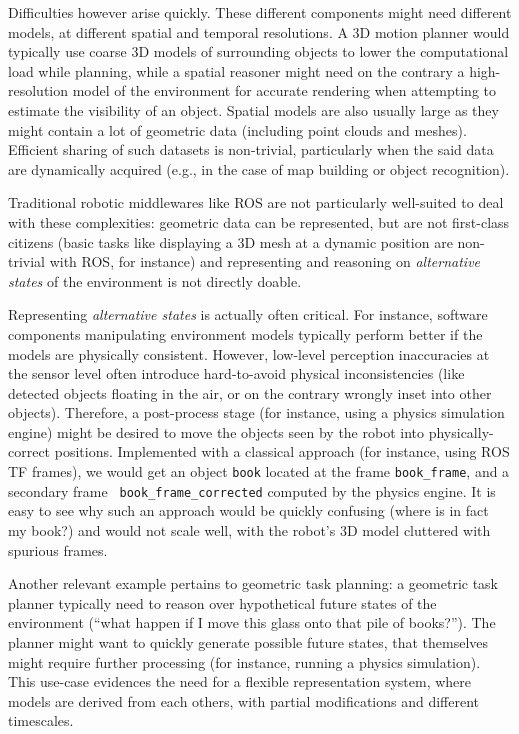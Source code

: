 \documentclass[letterpaper, 10 pt, conference]{ieeeconf}  %
\newcommand{\eg}{e.g.,\xspace}
\begin{document}
Difficulties however arise quickly. These different components might need
different models, at different spatial and temporal resolutions. A 3D motion
planner would typically use coarse 3D models of surrounding objects to lower the
computational load while planning, while a spatial reasoner might need on the
contrary a high-resolution model of the environment for accurate rendering when
attempting to estimate the visibility of an object. Spatial models are also
usually large as they might contain a lot of geometric data (including point
clouds and meshes). Efficient sharing of such datasets is non-trivial,
particularly when the said data are dynamically acquired (\eg in the case of
map building or object recognition).

Traditional robotic middlewares like ROS are not particularly well-suited to
deal with these complexities: geometric data can be represented, but are not
first-class citizens (basic tasks like displaying a 3D mesh at a dynamic
position are non-trivial with ROS, for instance) and representing and reasoning
on \emph{alternative states} of the environment is not directly doable.

Representing \emph{alternative states} is actually often critical. For instance,
software components manipulating environment models typically perform better if
the models are physically consistent. However, low-level perception inaccuracies
at the sensor level often introduce hard-to-avoid physical inconsistencies (like
detected objects floating in the air, or on the contrary wrongly inset into
other objects). Therefore, a post-process stage (for instance, using a physics
simulation engine) might be desired to move the objects seen
by the robot into physically-correct positions. Implemented with a classical
approach (for instance, using ROS TF frames), we would get an object {\tt book}
located at the frame {\tt book\_frame}, and a secondary frame {\tt
book\_frame\_corrected} computed by the physics engine. It is easy to see why
such an approach would be quickly confusing (where is in fact my book?) and would not
scale well, with the robot's 3D model cluttered with spurious frames.

Another relevant example pertains to geometric task planning: a geometric task
planner typically need to reason over hypothetical future states of the
environment (``what happen if I move this glass onto that pile of books?'').
The planner might want to quickly generate possible future states, that
themselves might require further processing (for instance, running a physics
simulation). This use-case evidences the need for a flexible representation
system, where models are derived from each others, with partial modifications
and different timescales.
\end{document}
